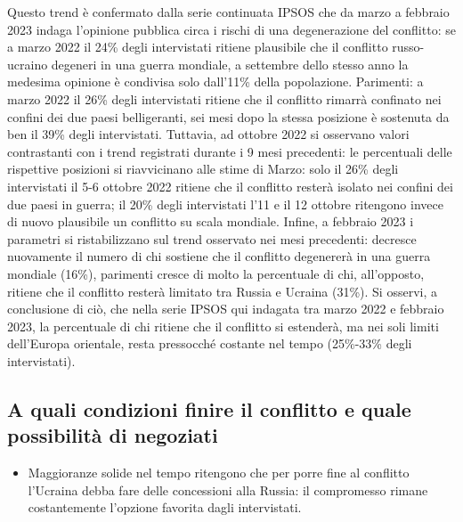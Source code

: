 \documentclass[
  openany]{book}
\providecommand{\tightlist}{%
  \setlength{\itemsep}{0pt}\setlength{\parskip}{0pt}}
\begin{document}
Questo trend è confermato dalla serie continuata IPSOS che da marzo a febbraio 2023 indaga l'opinione pubblica circa i rischi di una degenerazione del conflitto: se a marzo 2022 il 24\% degli intervistati ritiene plausibile che il conflitto russo-ucraino degeneri in una guerra mondiale, a settembre dello stesso anno la medesima opinione è condivisa solo dall'11\% della popolazione. Parimenti: a marzo 2022 il 26\% degli intervistati ritiene che il conflitto rimarrà confinato nei confini dei due paesi belligeranti, sei mesi dopo la stessa posizione è sostenuta da ben il 39\% degli intervistati. Tuttavia, ad ottobre 2022 si osservano valori contrastanti con i trend registrati durante i 9 mesi precedenti: le percentuali delle rispettive posizioni si riavvicinano alle stime di Marzo: solo il 26\% degli intervistati il 5-6 ottobre 2022 ritiene che il conflitto resterà isolato nei confini dei due paesi in guerra; il 20\% degli intervistati l'11 e il 12 ottobre ritengono invece di nuovo plausibile un conflitto su scala mondiale. Infine, a febbraio 2023 i parametri si ristabilizzano sul trend osservato nei mesi precedenti: decresce nuovamente il numero di chi sostiene che il conflitto degenererà in una guerra mondiale (16\%), parimenti cresce di molto la percentuale di chi, all'opposto, ritiene che il conflitto resterà limitato tra Russia e Ucraina (31\%). Si osservi, a conclusione di ciò, che nella serie IPSOS qui indagata tra marzo 2022 e febbraio 2023, la percentuale di chi ritiene che il conflitto si estenderà, ma nei soli limiti dell'Europa orientale, resta pressocché costante nel tempo (25\%-33\% degli intervistati).

\hypertarget{a-quali-condizioni-finire-il-conflitto-e-quale-possibilituxe0-di-negoziati}{%
\subsection{A quali condizioni finire il conflitto e quale possibilità di negoziati}\label{a-quali-condizioni-finire-il-conflitto-e-quale-possibilituxe0-di-negoziati}}

\begin{itemize}
\tightlist
\item
  Maggioranze solide nel tempo ritengono che per porre fine al conflitto l'Ucraina debba fare delle concessioni alla Russia: il compromesso rimane costantemente l'opzione favorita dagli intervistati.
\end{itemize}
\end{document}

